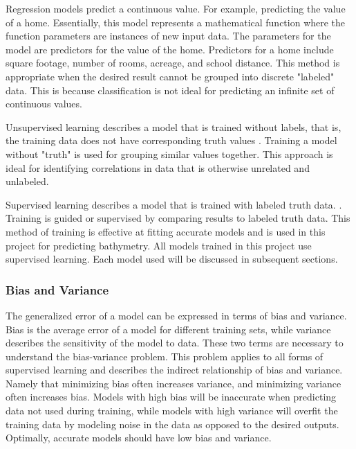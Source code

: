 \par
Regression models predict a continuous value.
For example, predicting the value of a home.
Essentially, this model represents a mathematical function where the function parameters are instances of new input data.
The parameters for the model are predictors for the value of the home.
Predictors for a home include square footage, number of rooms, acreage, and school distance.
This method is appropriate when the desired result cannot be grouped into discrete "labeled" data.
This is because classification is not ideal for predicting an infinite set of continuous values.

\par
Unsupervised learning describes a model that is trained without labels, that is, the training data does not have corresponding truth values \cite{bishop2006pattern}.
Training a model without "truth" is used for grouping similar values together.
This approach is ideal for identifying correlations in data that is otherwise unrelated and unlabeled.

\par
Supervised learning describes a model that is trained with labeled truth data. \cite{bishop2006pattern}.
Training is guided or supervised by comparing results to labeled truth data.
This method of training is effective at fitting accurate models and is used in this project for predicting bathymetry.
All models trained in this project use supervised learning.
Each model used will be discussed in subsequent sections.

\subsubsection{Bias and Variance}
The generalized error of a model can be expressed in terms of bias and variance.
Bias is the average error of a model for different training sets, while variance describes the sensitivity of the model to data.
These two terms are necessary to understand the bias-variance problem.
This problem applies to all forms of supervised learning \cite{geman1992neural} and describes the indirect relationship of bias and variance.
Namely that minimizing bias often increases variance, and minimizing variance often increases bias.
Models with high bias will be inaccurate when predicting data not used during training, while models with high variance will overfit \cite{cawley2010over} the training data by modeling noise in the data as opposed to the desired outputs.
Optimally, accurate models should have low bias and variance.

